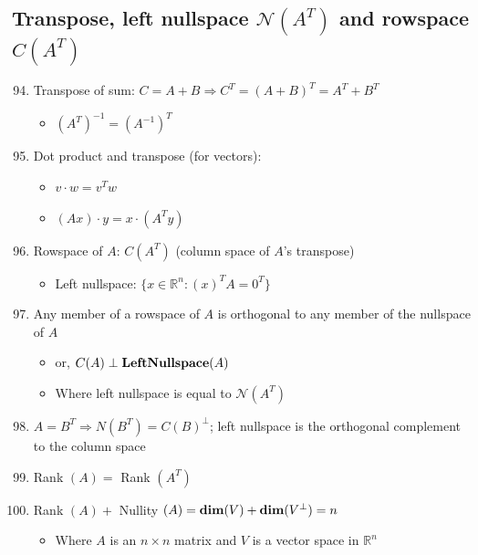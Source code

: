 \documentclass[10pt,letterpaper]{article}
\begin{document}
\subsection{Transpose, left nullspace $\mathcal{N}(A ^{T} )$ and rowspace $C(A ^{T} )$}
\label{sec-1_7}

\begin{enumerate}
\setcounter{enumi}{93}
\item  Transpose of sum: $C=A+B \Rightarrow C ^{T} = (A + B)^{T} = A ^{T} + B ^{T}$

\begin{itemize}
\item $(A ^{T}) ^{-1} = (A ^{-1} ) ^{T}$
\end{itemize}

\item Dot product and transpose (for vectors):

\begin{itemize}
\item $v \cdot w = v^T w$
\item $(Ax) \cdot y = x \cdot (A^T y)$
\end{itemize}

\item Rowspace of $A$: $C(A^T)$ (column space of $A$'s transpose)

\begin{itemize}
\item Left nullspace: $\{x \in \mathbb{R}^{n}: (x) ^{T} A = 0 ^{T} \}$
\end{itemize}

\item Any member of a rowspace of $A$ is orthogonal to any member of the nullspace of $A$

\begin{itemize}
\item or, $C(A) \perp {\bf Left Nullspace} (A)$
\item Where left nullspace is equal to $\mathcal{N} (A ^{T} )$
\end{itemize}

\item $A=B ^{T} \Rightarrow N(B ^{T}) = C(B) ^{\perp}$; left nullspace is the orthogonal complement to the column space
\item Rank $(A)=$ Rank $(A ^{T})$
\item Rank $(A)+$ Nullity $(A)= {\bf dim} (V) + {\bf dim} (V ^{\perp}) = n$

\begin{itemize}
\item Where $A$ is an $n \times n$ matrix and $V$ is a vector space in $\mathbb{R}^{n}$
\end{itemize}


\end{enumerate}
\end{document}
